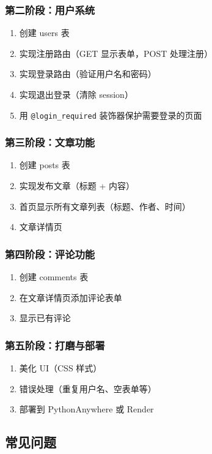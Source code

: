 \documentclass[a4paper,12pt]{ctexart}
\begin{document}
\subsubsection*{第二阶段：用户系统}
\begin{enumerate}
  \item 创建 users 表
  \item 实现注册路由（GET 显示表单，POST 处理注册）
  \item 实现登录路由（验证用户名和密码）
  \item 实现退出登录（清除 session）
  \item 用 \texttt{@login\_required} 装饰器保护需要登录的页面
\end{enumerate}

\subsubsection*{第三阶段：文章功能}
\begin{enumerate}
  \item 创建 posts 表
  \item 实现发布文章（标题 + 内容）
  \item 首页显示所有文章列表（标题、作者、时间）
  \item 文章详情页
\end{enumerate}

\subsubsection*{第四阶段：评论功能}
\begin{enumerate}
  \item 创建 comments 表
  \item 在文章详情页添加评论表单
  \item 显示已有评论
\end{enumerate}

\subsubsection*{第五阶段：打磨与部署}
\begin{enumerate}
  \item 美化 UI（CSS 样式）
  \item 错误处理（重复用户名、空表单等）
  \item 部署到 PythonAnywhere 或 Render
\end{enumerate}

\subsection*{常见问题}
\end{document}
